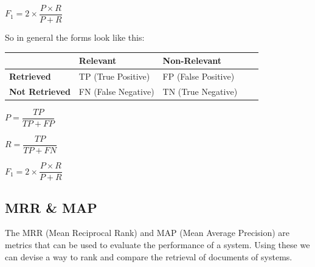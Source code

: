 \documentclass[
../../NLP4W_Summary.tex,
]
{subfiles}
\begin{document}
\begin{center}
    \begin{smallmathbox*}
        $F_1 = 2 \times \dfrac{P \times R}{P + R}$
    \end{smallmathbox*}
\end{center}

So in general the forms look like this:
\begin{table}[htp]
    \centering
    \begin{tabular}{|l|l|l|l|l|}
        \hline
        & \textbf{Relevant} & \textbf{Non-Relevant} \\ \hline
        \textbf{Retrieved} & TP (True Positive) & FP (False Positive) \\ \hline
        \textbf{Not Retrieved} & FN (False Negative) & TN (True Negative) \\ \hline
    \end{tabular}
\end{table}

\begin{minipage}
    [t]{0.3\textwidth}
    \begin{center}
        \begin{smallmathbox}
            [Precision]
            $P = \dfrac{TP}{TP + FP}$
        \end{smallmathbox}
    \end{center}
\end{minipage}
\hfill
\begin{minipage}
    [t]{0.3\textwidth}
    \begin{center}
        \begin{smallmathbox}
            [Recall]
            $R = \dfrac{TP}{TP + FN}$
        \end{smallmathbox}
    \end{center}
\end{minipage}
\hfill
\begin{minipage}
    [t]{0.3\textwidth}
    \begin{center}
        \begin{smallmathbox}
            [F-Score]
            $F_1 = 2 \times \dfrac{ P \times R}{P + R}$
        \end{smallmathbox}
    \end{center}
\end{minipage}

\newpage
\subsection{MRR \& MAP}
The MRR (Mean Reciprocal Rank) and MAP (Mean Average Precision) are metrics that can be used to evaluate the performance of a system. Using these we can devise a way to rank and compare the retrieval of documents of systems. 
\end{document}
